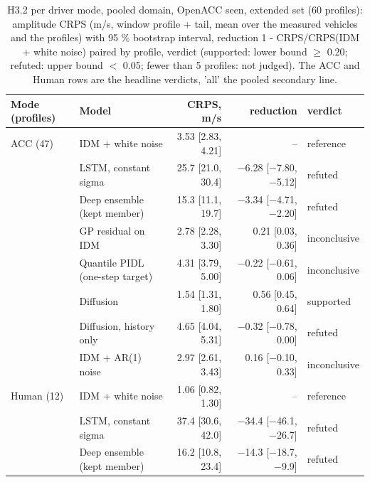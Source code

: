 \begin{table}[htbp]
\centering
\small
\caption{H3.2 per driver mode, pooled domain, OpenACC seen, extended set (60 profiles): amplitude CRPS (m/s, window profile + tail, mean over the measured vehicles and the profiles) with 95 \% bootstrap interval, reduction 1 - CRPS/CRPS(IDM + white noise) paired by profile, verdict (supported: lower bound $\geq$ 0.20; refuted: upper bound $<$ 0.05; fewer than 5 profiles: not judged). The ACC and Human rows are the headline verdicts, 'all' the pooled secondary line.}
\label{tab:t5-h32--e3--pool}
\begin{tabular}{llrrl}
\toprule
Mode (profiles) & Model & CRPS, m/s & reduction & verdict \\
\midrule
ACC (47) & IDM + white noise & 3.53 [2.83, 4.21] & -- & reference \\
 & LSTM, constant sigma & 25.7 [21.0, 30.4] & $-$6.28 [$-$7.80, $-$5.12] & refuted \\
 & Deep ensemble (kept member) & 15.3 [11.1, 19.7] & $-$3.34 [$-$4.71, $-$2.20] & refuted \\
 & GP residual on IDM & 2.78 [2.28, 3.30] & 0.21 [0.03, 0.36] & inconclusive \\
 & Quantile PIDL (one-step target) & 4.31 [3.79, 5.00] & $-$0.22 [$-$0.61, 0.06] & inconclusive \\
 & Diffusion & 1.54 [1.31, 1.80] & 0.56 [0.45, 0.64] & supported \\
 & Diffusion, history only & 4.65 [4.04, 5.31] & $-$0.32 [$-$0.78, 0.00] & refuted \\
 & IDM + AR(1) noise & 2.97 [2.61, 3.43] & 0.16 [$-$0.10, 0.33] & inconclusive \\
\midrule
Human (12) & IDM + white noise & 1.06 [0.82, 1.30] & -- & reference \\
 & LSTM, constant sigma & 37.4 [30.6, 42.0] & $-$34.4 [$-$46.1, $-$26.7] & refuted \\
 & Deep ensemble (kept member) & 16.2 [10.8, 23.4] & $-$14.3 [$-$18.7, $-$9.9] & refuted \\

\end{tabular}
\end{table}
